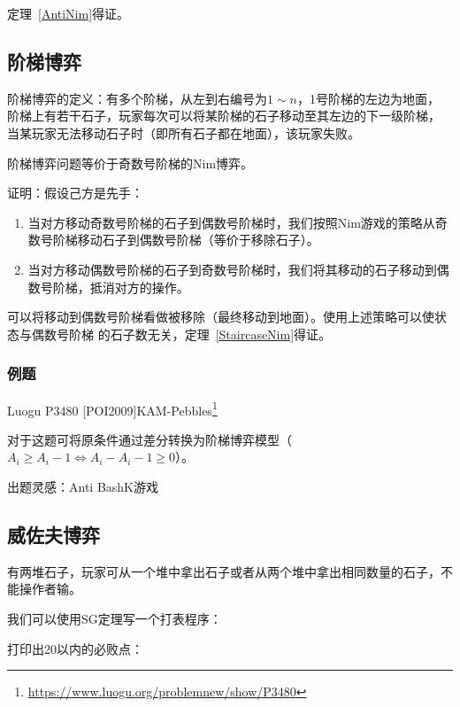 定理~\ref{AntiNim}得证。

\subsection{阶梯博弈}
阶梯博弈的定义：有多个阶梯，从左到右编号为$1\sim n$，1号阶梯的左边为地面，
阶梯上有若干石子，玩家每次可以将某阶梯的石子移动至其左边的下一级阶梯，
当某玩家无法移动石子时（即所有石子都在地面），该玩家失败。

\begin{theorem}\label{StaircaseNim}
	阶梯博弈问题等价于奇数号阶梯的Nim博弈。
\end{theorem}

证明：假设己方是先手：

\begin{enumerate}
	\item 当对方移动奇数号阶梯的石子到偶数号阶梯时，我们按照Nim游戏的策略从奇
	      数号阶梯移动石子到偶数号阶梯（等价于移除石子）。
	\item 当对方移动偶数号阶梯的石子到奇数号阶梯时，我们将其移动的石子移动到偶
	      数号阶梯，抵消对方的操作。
\end{enumerate}

可以将移动到偶数号阶梯看做被移除（最终移动到地面）。使用上述策略可以使状态与偶数号阶梯
的石子数无关，定理~\ref{StaircaseNim}得证。

\subsubsection{例题}

Luogu P3480 [POI2009]KAM-Pebbles\footnote{
	\url{https://www.luogu.org/problemnew/show/P3480}
}

对于这题可将原条件通过差分转换为阶梯博弈模型（$A_i \geq A_i-1 \Leftrightarrow
	A_i-A_i-1 \geq 0$）。



出题灵感：Anti BashK游戏

\subsection{威佐夫博弈}
有两堆石子，玩家可从一个堆中拿出石子或者从两个堆中拿出相同数量的石子，不能操作者输。

我们可以使用SG定理写一个打表程序：


打印出20以内的必败点：

